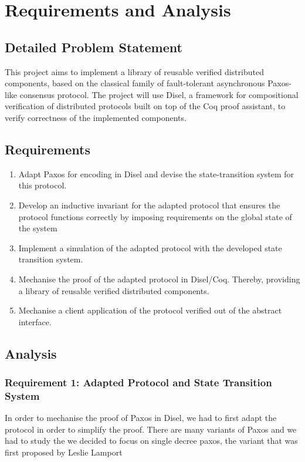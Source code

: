 \chapter{Requirements and Analysis}

\section{Detailed Problem Statement}
This project aims to implement a library of reusable verified distributed components,
based on the classical family of fault-tolerant asynchronous Paxos-like consensus protocol.
The project will use Disel, a framework for compositional verification of distributed
protocols built on top of the Coq proof assistant, to verify correctness of the
implemented components.

\section{Requirements}
\begin{enumerate}
  \item Adapt Paxos for encoding in Disel and devise the state-transition system for this protocol.
  \item Develop an inductive invariant for the adapted protocol that
    ensures the protocol functions correctly by imposing requirements on the global state of the system
  \item Implement a simulation of the adapted protocol with the developed state transition system.
  \item Mechanise the proof of the adapted protocol in Disel/Coq.
    Thereby, providing a library of reusable verified distributed components.
  \item Mechanise a client application of the protocol verified out of the abstract interface.
\end{enumerate}

\section{Analysis}
\subsection{Requirement 1: Adapted Protocol and State Transition System}
In order to mechanise the proof of Paxos in Disel, we had to first adapt the
protocol in order to simplify the proof. There are many variants of Paxos and
we had to study the we decided to focus on single decree paxos, the variant that
was first proposed by Leslie Lamport %

